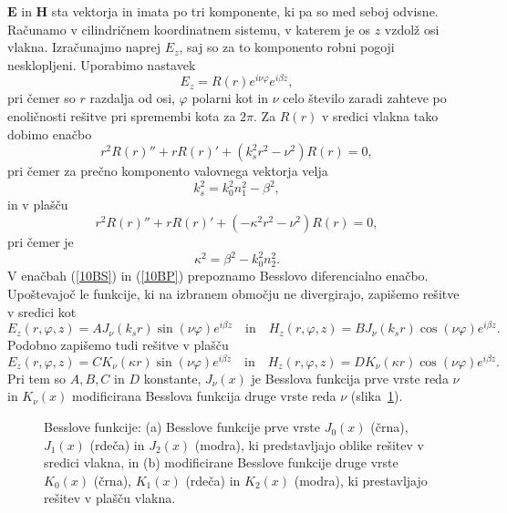 $\mathbf{E}$ in $\mathbf{H}$ sta vektorja in imata po 
tri komponente, ki pa so med seboj odvisne. Računamo v cilindričnem koordinatnem sistemu,
v katerem je os $z$ vzdolž osi vlakna. Izračunajmo naprej $E_z$, saj so za to
komponento robni pogoji nesklopljeni. Uporabimo nastavek
\begin{equation}
E_z = R(r)e^{i \nu \varphi}e^{i \beta z},
\end{equation}
pri čemer so $r$ razdalja od osi, $\varphi$ polarni kot in $\nu$ celo število zaradi 
zahteve po enoličnosti rešitve pri spremembi
kota za $2\pi$. Za $R(r)$ v sredici vlakna tako dobimo enačbo
\begin{equation}
r^2 R(r)'' + r R(r)' + (k_s^2r^2 - \nu^2)R(r) = 0,
\label{10BS}
\end{equation}
pri čemer za prečno komponento valovnega vektorja velja
\begin{equation}
k_s^2=k_0^2n_1^2- \beta^2,
\label{eq:ks}
\end{equation}
in v plašču
\begin{equation}
r^2 R(r)'' + r R(r)' + (-\kappa^2r^2 - \nu^2)R(r) = 0,
\label{10BP}
\end{equation}
pri čemer je 
\begin{equation}
\kappa^2=\beta^2-k_0^2n_2^2.
\end{equation}
V enačbah (\ref{10BS}) in (\ref{10BP}) prepoznamo Besslovo diferencialno enačbo. 
Upoštevajoč le funkcije, ki na izbranem območju ne divergirajo, zapišemo rešitve v sredici kot
\begin{equation}
E_z (r, \varphi, z) = A J_\nu(k_sr)\sin(\nu \varphi)e^{i \beta z} \quad  \mathrm{in} \quad 
H_z (r, \varphi, z) = B J_\nu(k_sr)\cos(\nu \varphi)e^{i \beta z}.
\end{equation}
Podobno zapišemo tudi rešitve v plašču
\begin{equation}
E_z (r, \varphi, z)= C K_\nu(\kappa r)\sin(\nu \varphi)e^{i \beta z} \quad \mathrm{in} \quad 
H_z (r, \varphi, z)= D K_\nu(\kappa r)\cos(\nu \varphi)e^{i \beta z}.
\end{equation}
Pri tem so $A,B,C$ in $D$ konstante, $J_\nu(x)$ je Besslova funkcija prve vrste reda 
$\nu$ in $K_\nu(x)$ modificirana Besslova funkcija druge vrste reda $\nu$ 
(slika~\ref{fig:J01}). 
\begin{figure}[ht]
\centering
\def\svgwidth{140truemm} 
 
\caption{Besslove funkcije: (a) Besslove funkcije prve vrste 
$J_0(x)$ (črna), $J_1(x)$ (rdeča) in $J_2(x)$ (modra), 
ki predstavljajo oblike rešitev v sredici vlakna, in (b)
modificirane Besslove funkcije druge vrste $K_0(x)$ (črna), $K_1(x)$ (rdeča) in $K_2(x)$ (modra), 
ki prestavljajo rešitev v plašču vlakna.}
\label{fig:J01}
\end{figure}

